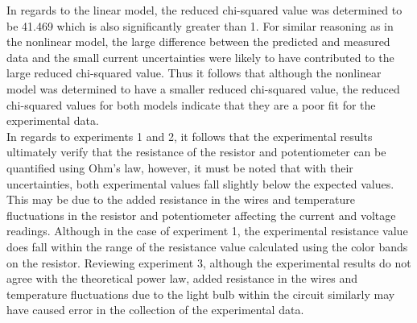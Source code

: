 \documentclass[
	letterpaper, %
	10pt, %
]{CSUniSchoolLabReport}
\begin{document}
In regards to the linear model, the reduced chi-squared value was determined to be 41.469 which is also significantly greater than 1.
For similar reasoning as in the nonlinear model, the large difference between the predicted and measured data and the small current uncertainties were
likely to have contributed to the large reduced chi-squared value. Thus it follows that although the nonlinear model was determined to have a smaller
reduced chi-squared value, the reduced chi-squared values for both models indicate that they are a poor fit for the experimental data.\\

In regards to experiments 1 and 2, it follows that the experimental results ultimately verify that the resistance of the resistor and potentiometer
	can be quantified using Ohm’s law, however, it must be noted that with their uncertainties, both experimental values fall slightly below the expected values.
This may be due to the added resistance in the wires and temperature fluctuations in the resistor and potentiometer affecting the current and voltage readings.
Although in the case of experiment 1, the experimental resistance value does fall within the range of the resistance value calculated using the color bands on the resistor.
Reviewing experiment 3, although the experimental results do not agree with the theoretical power law, added resistance in the wires and temperature fluctuations
	due to the light bulb within the circuit similarly may have caused error in the collection of the experimental data.

\newpage
\end{document}
